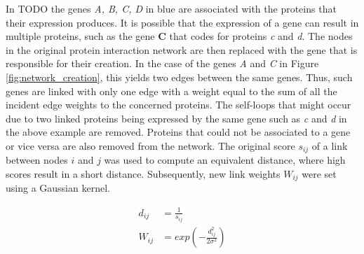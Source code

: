 \documentclass[10pt,conference,compsocconf]{IEEEtran}
\begin{document}
In TODO the genes \textit{A, B, C, D} in blue are associated with the proteins that their expression produces. It is possible that the expression of a gene can result in multiple proteins, such as the gene \textbf{C} that codes for proteins \textit{c} and \textit{d}. The nodes in the original protein interaction network are then replaced with the gene that is responsible for their creation. In the case of the genes \textit{A} and \textit{C} in Figure \ref{fig:network_creation}, this yields two edges between the same genes. Thus, such genes are linked with only one edge with a weight equal to the sum of all the incident edge weights to the concerned proteins. The self-loops that might occur due to two linked proteins being expressed by the same gene such as \textit{c} and \textit{d} in the above example are removed. Proteins that could not be associated to a gene or vice versa are also removed from the network.
The original score $s_{ij}$ of a link between nodes $i$ and $j$ was used to compute an equivalent distance, where high scores result in a short distance. Subsequently, new link weights $W_{ij}$ were set using a Gaussian kernel.

\begin{align}
d_{ij} &= \frac{1}{s_{ij}} \\
W_{ij} &= exp (- \frac{d_{ij}^2}{2 \sigma^2})
\end{align}
\par
\end{document}
